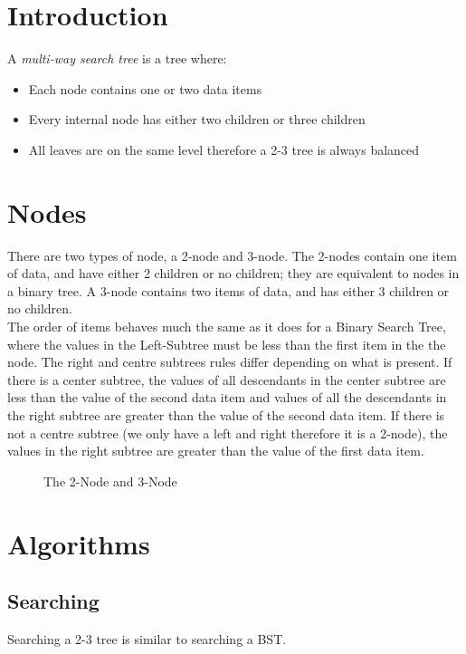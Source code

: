 
\section{Introduction}
A \textit{multi-way search tree} is a tree where:
\begin{itemize}
    \item Each node contains one or two data items
    \item Every internal node has either two children or three children
    \item All leaves are on the same level therefore a 2-3 tree is always balanced
\end{itemize}

\section{Nodes}
There are two types of node, a 2-node and 3-node. The 2-nodes contain one item of data, and have either 2 children or no children; they are equivalent to nodes in a binary tree. A 3-node contains two items of data, and has either 3 children or no children.\\

The order of items behaves much the same as it does for a Binary Search Tree, where the values in the Left-Subtree must be less than the first item in the the node. The right and centre subtrees rules differ depending on what is present. If there is a center subtree, the values of all descendants in the center subtree are less than the value of the second data item and values of all the descendants in the right subtree are greater than the value of the second data item. If there is not a centre subtree (we only have a left and right therefore it is a 2-node), the values in the right subtree are greater than the value of the first data item.
\begin{figure}[H]
    \centering
    
    \caption{The 2-Node and 3-Node}
\end{figure}

\section{Algorithms}
\subsection{Searching}
Searching a 2-3 tree is similar to searching a BST.

